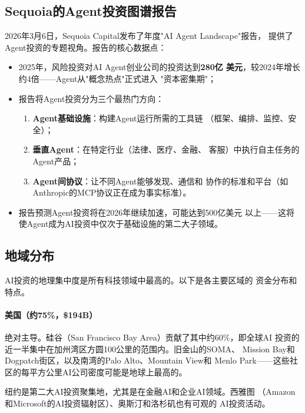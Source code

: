 \subsection{Sequoia的Agent投资图谱报告}
\label{subsec:fund-sequoia-landscape}

2026年3月6日，Sequoia Capital发布了年度"AI Agent Landscape"报告，
提供了Agent投资的专题视角。报告的核心数据点：

\begin{itemize}
  \item 2025年，风险投资对AI Agent创业公司的投资达到\textbf{280亿
    美元}，较2024年增长约4倍——Agent从"概念热点"正式进入
    "资本密集期"；
  \item 报告将Agent投资分为三个最热门方向：
    \begin{enumerate}
      \item \textbf{Agent基础设施}：构建Agent运行所需的工具链
        （框架、编排、监控、安全）；
      \item \textbf{垂直Agent}：在特定行业（法律、医疗、金融、
        客服）中执行自主任务的Agent产品；
      \item \textbf{Agent间协议}：让不同Agent能够发现、通信和
        协作的标准和平台（如Anthropic的MCP协议正在成为事实标准）。
    \end{enumerate}
  \item 报告预测Agent投资将在2026年继续加速，可能达到500亿美元
    以上——这将使Agent成为AI投资中仅次于基础设施的第二大子领域。
\end{itemize}

\subsection{地域分布}
\label{subsec:fund-geography}

AI投资的地理集中度是所有科技领域中最高的。以下是各主要区域的
资金分布和特点。

\paragraph{美国（约75\%，\$194B）}

绝对主导。硅谷（San Francisco Bay Area）贡献了其中约60\%，即全球AI
投资的近一半集中在加州湾区方圆100公里的范围内。旧金山的SOMA、
Mission Bay和Dogpatch街区，以及南湾的Palo Alto、Mountain View和
Menlo Park——这些社区的每平方公里AI公司密度可能是地球上最高的。

纽约是第二大AI投资聚集地，尤其是在金融AI和企业AI领域。西雅图
（Amazon和Microsoft的AI投资辐射区）、奥斯汀和洛杉矶也有可观的
AI投资活动。

